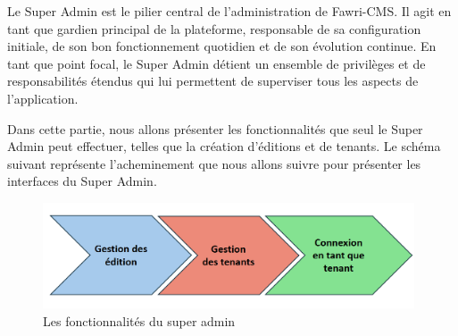 \hspace{\parindent}Le Super Admin est le pilier central de l'administration de Fawri-CMS. Il agit en tant que gardien principal de la plateforme, responsable de sa configuration initiale, de son bon fonctionnement quotidien et de son évolution continue. En tant que point focal, le Super Admin détient un ensemble de privilèges et de responsabilités étendus qui lui permettent de superviser tous les aspects de l'application.

Dans cette partie, nous allons présenter les fonctionnalités que seul le Super Admin peut effectuer, telles que la création d'éditions et de tenants. Le schéma suivant représente l'acheminement que nous allons suivre pour présenter les interfaces du Super Admin.

\begin{figure}[H]
    \centering
    \includegraphics[width=11cm]{Figures/fonctionnalite super admin.PNG}
    \caption{Les fonctionnalités du super admin}
\end{figure}

